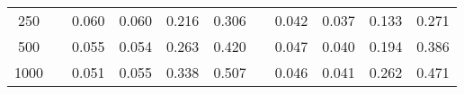 % 
\begin{tabular}{ccccccccccc}
  \hline
  \hline
250 &  & 0.060 & 0.060 & 0.216 & 0.306 &  & 0.042 & 0.037 & 0.133 & 0.271 \\ 
  500 &  & 0.055 & 0.054 & 0.263 & 0.420 &  & 0.047 & 0.040 & 0.194 & 0.386 \\ 
  1000 &  & 0.051 & 0.055 & 0.338 & 0.507 &  & 0.046 & 0.041 & 0.262 & 0.471 \\ 
   \hline
\end{tabular}
